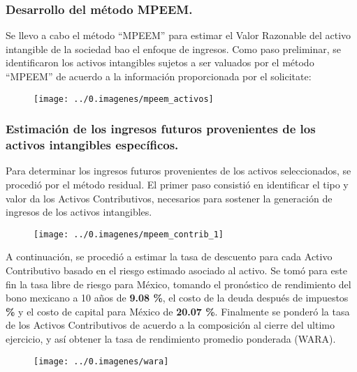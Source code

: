 \subsubsection{Desarrollo del método MPEEM.}

Se llevo a cabo  el método ``MPEEM''  para estimar el Valor Razonable del activo intangible de la sociedad \textcolor{principal} bao el enfoque de ingresos. Como paso preliminar, se identificaron los activos intangibles sujetos a ser valuados por el método ``MPEEM'' de acuerdo a la información proporcionada por el solicitate:

\begin{figure}[H]
\centering
	\texttt{[image: ../0.imagenes/mpeem\_activos]}
\end{figure}

\subsubsection*{Estimación de los ingresos futuros provenientes de los activos intangibles específicos.}

Para determinar los ingresos futuros provenientes de los activos seleccionados, se procedió por el método residual. El primer paso consistió en identificar el tipo y valor da los \textcolor{principal}{Activos Contributivos}, necesarios para sostener la generación de ingresos de los activos intangibles. 

\begin{figure}[H]
\centering
	\texttt{[image: ../0.imagenes/mpeem\_contrib\_1]}
\end{figure}

A continuación, se procedió a estimar la tasa de descuento para cada \textcolor{principal}{Activo Contributivo} basado en el riesgo estimado asociado al activo. Se tomó para este fin la tasa libre de riesgo para México, tomando el pronóstico de rendimiento del bono mexicano a 10 años de \textbf{9.08 \%}, el costo de la deuda después de impuestos \textbf{\kdValor \%} y el costo de capital  para México de \textbf{20.07 \%}. Finalmente se ponderó la tasa de los \textcolor{principal}{Activos Contributivos} de acuerdo a la composición al cierre del ultimo ejercicio, y así obtener la tasa de rendimiento promedio ponderada (\textcolor{principal}{WARA}).\\

\begin{figure}[H]
\centering
	\texttt{[image: ../0.imagenes/wara]}
\end{figure}

